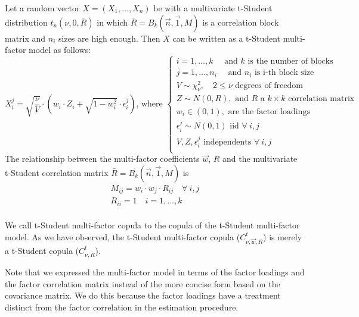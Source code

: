 \documentclass[11pt,fleqn]{book} %
\begin{document}
\begin{proposition}
	\label{prop:tmfm}
	Let a random vector $X=(X_1,\dots,X_n)$ be with a multivariate t-Student 
	distribution $t_n(\nu,0,\bar{R})$ in which $\bar{R} = B_k(\vec{n},\vec{1},M)$ 
	is a correlation block matrix and $n_i$ sizes are high enough. 
	Then $X$ can be written as a t-Student multi-factor model as follows:
	\begin{displaymath}
		X_i^j = \sqrt{\frac{\nu}{V}} \cdot 
		\left( w_i \cdot Z_i + \sqrt{1-w_i^2} \cdot \epsilon_i^j \right)
		\text{, where } \left\{
		\begin{array}{l}
			i = 1, \dots, k \quad \text{ and $k$ is the number of blocks}      \\
			j = 1, \dots, n_i \quad \text{ and $n_i$ is i-th block size}       \\
			V \sim \chi_{\nu}^2, \quad 2 \le \nu \text{ degrees of freedom}    \\
			Z \sim N(0,R), \text{ and $R$ a $k {\times} k$ correlation matrix} \\
			w_i \in (0,1), \text{ are the factor loadings }                    \\
			\epsilon_i^j \sim N(0,1) \text { iid } \forall\ i,j                \\
			V, Z, \epsilon_i^j \text{ independents } \forall\ i,j              \\
		\end{array}
		\right.
	\end{displaymath}
	The relationship between the multi-factor coefficients $\vec{w}$, $R$ and the
	multivariate t-Student correlation matrix $\bar{R} = B_k(\vec{n},\vec{1},M)$ 
	is
	\begin{displaymath}
		\begin{array}{l}
			M_{ij} = w_i \cdot w_j \cdot R_{ij} \quad \forall\ i,j \\
			R_{ii} = 1 \quad i = 1,\dots,k \\
		\end{array}
	\end{displaymath}
\end{proposition}

We call t-Student multi-factor copula to the copula of the t-Student 
multi-factor model. As we have observed, the t-Student multi-factor copula 
($C_{\nu,\vec{w},R}^t$) is merely a t-Student copula ($C_{\nu,\bar{R}}^t$).

Note that we expressed the multi-factor model in terms of the factor loadings 
and the factor correlation matrix instead of the more concise form based on 
the covariance matrix. We do this because the factor loadings have a treatment 
distinct from the factor correlation in the estimation procedure.
\end{document}
